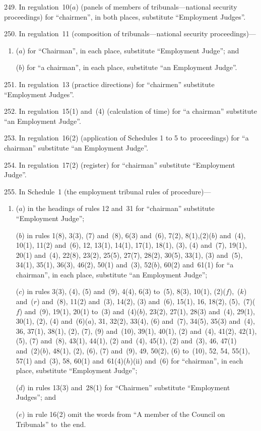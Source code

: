 \documentclass[12pt,a4paper]{article}
\begin{document}
\medskip

249.  In regulation~10($a$)  (panels of members of tribunals---national security proceedings) for “chairmen”, in both places, substitute “Employment Judges”.

\medskip

250.  In regulation~11 (composition of tribunals---national security proceedings)—
\begin{enumerate}\item[]
($a$) for “Chairman”, in each place, substitute “Employment Judge”; and

($b$) for “a chairman”, in each place, substitute “an Employment Judge”.
\end{enumerate}

\medskip

251.  In regulation~13 (practice directions) for “chairmen” substitute “Employment Judges”.

\medskip

252.  In regulation~15(1) and~(4) (calculation of time) for “a chairman” substitute “an Employment Judge”.

\medskip

253.  In regulation~16(2) (application of Schedules 1 to 5 to~proceedings) for “a chairman” substitute “an Employment Judge”.

\medskip

254.  In regulation~17(2) (register) for “chairman” substitute “Employment Judge”.

\medskip

255.  In Schedule~1 (the employment tribunal rules of procedure)—
\begin{enumerate}\item[]
($a$) in the headings of rules 12 and~31 for “chairman” substitute “Employment Judge”;

($b$) in rules 1(8), 3(3), (7) and~(8), 6(3) and~(6), 7(2), 8(1),(2)($b$)  and~(4), 10(1), 11(2) and~(6), 12, 13(1), 14(1), 17(1), 18(1), (3), (4) and~(7), 19(1), 20(1) and~(4), 22(8), 23(2), 25(5), 27(7), 28(2), 30(5), 33(1), (3) and~(5), 34(1), 35(1), 36(3), 46(2), 50(1) and~(3), 52($b$), 60(2) and~61(1) for “a chairman”, in each place, substitute “an Employment Judge”;

($c$) in rules 3(3), (4), (5) and~(9), 4(4), 6(3) to~(5), 8(3), 10(1), (2)($f$),~($k$)  and~($r$)  and~(8), 11(2) and~(3), 14(2), (3) and~(6), 15(1), 16, 18(2), (5),~(7)($f$)  and~(9), 19(1), 20(1) to~(3) and~(4)($b$), 23(2), 27(1), 28(3) and~(4), 29(1), 30(1), (2), (4) and~(6)($a$), 31, 32(2), 33(4), (6) and~(7), 34(5), 35(3) and~(4), 36, 37(1), 38(1), (2), (7), (9) and~(10), 39(1), 40(1), (2) and~(4), 41(2), 42(1), (5), (7) and~(8), 43(1), 44(1), (2) and~(4), 45(1), (2) and~(3), 46, 47(1) and~(2)($b$), 48(1), (2), (6), (7) and~(9), 49, 50(2), (6) to~(10), 52, 54, 55(1), 57(1) and~(3), 58, 60(1) and~61(4)($h$)(ii)  and~(6) for “chairman”, in each place, substitute “Employment Judge”;

($d$) in rules 13(3) and~28(1) for “Chairmen” substitute “Employment Judges”; and

($e$) in rule 16(2) omit the words from “A member of the Council on Tribunals” to~the end.
\end{enumerate}
\end{document}
